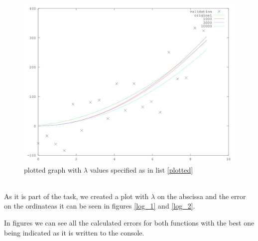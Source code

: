 \documentclass[12pt]{article}
\begin{document}
	\begin{figure}
		\centering
		\includegraphics[scale=0.8]{plot}
		\caption{plotted graph with $\lambda$ values specified as in list \ref{plotted}}
	\end{figure}
\\
As it is part of the task, we created a plot with $\lambda$ on the abscissa and the error on the ordinateas it can be seen in figures \ref{log_1} and \ref{log_2}. 

In figures  we can see all the calculated errors for both functions with the best one being indicated as it is written to the console.
\end{document}
